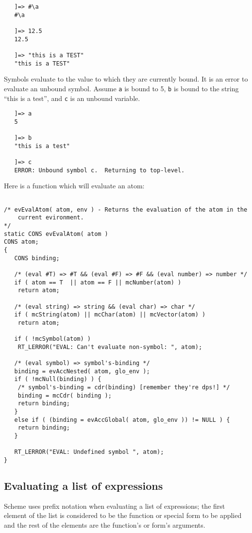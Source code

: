 \begin{verbatim}
   ]=> #\a
   #\a

   ]=> 12.5
   12.5

   ]=> "this is a TEST"
   "this is a TEST"
\end{verbatim}

	Symbols evaluate to the value to which they are currently bound.
It is an error to evaluate an unbound symbol.  Assume {\tt a} is bound to
5, {\tt b} is bound to the string ``this is a test'', and {\tt c} is an
unbound variable.

\begin{verbatim}
   ]=> a
   5

   ]=> b
   "this is a test"

   ]=> c
   ERROR: Unbound symbol c.  Returning to top-level.
\end{verbatim}

	Here is a function which will evaluate an atom:

\begin{verbatim}

/* evEvalAtom( atom, env ) - Returns the evaluation of the atom in the
	current evironment.
*/
static CONS evEvalAtom( atom )
CONS atom;
{
   CONS binding;

   /* (eval #T) => #T && (eval #F) => #F && (eval number) => number */
   if ( atom == T  || atom == F || mcNumber(atom) )
	return atom;

   /* (eval string) => string && (eval char) => char */
   if ( mcString(atom) || mcChar(atom) || mcVector(atom) )
	return atom;

   if ( !mcSymbol(atom) )
	RT_LERROR("EVAL: Can't evaluate non-symbol: ", atom);

   /* (eval symbol) => symbol's-binding */
   binding = evAccNested( atom, glo_env );
   if ( !mcNull(binding) ) {
	/* symbol's-binding = cdr(binding) [remember they're dps!] */
	binding = mcCdr( binding );
	return binding;
   }
   else if ( (binding = evAccGlobal( atom, glo_env )) != NULL ) {
	return binding;
   }

   RT_LERROR("EVAL: Undefined symbol ", atom);
}
\end{verbatim}

   \subsection{Evaluating a list of expressions}

	Scheme uses prefix notation when evaluating a list of
expressions; the first element of the list is considered to be the
function or special form to be applied and the rest of the elements are
the function's or form's arguments.

